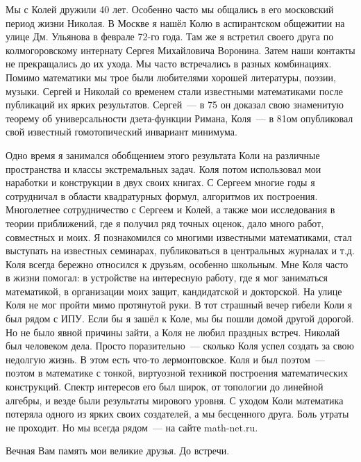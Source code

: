 
\vzmscaption

Мы с Колей дружили 40 лет. Особенно часто мы общались в его московский период жизни Николая.
В Москве я нашёл Колю в аспирантском общежитии на улице Дм. Ульянова в феврале 72-го  года.
Там же   я встретил   своего друга по колмогоровскому интернату Сергея  Михайловича Воронина.
Затем наши контакты не прекращались до их ухода. Мы часто встречались в разных комбинациях.
Помимо математики мы трое были любителями хорошей литературы, поэзии, музыки.
Сергей и Николай со временем стали  известными математиками после публикаций их ярких результатов.
Сергей~--- в 75 он  доказал свою знаменитую теорему об универсальности дзета-функции Римана,
Коля~--- в  81ом опубликовал свой известный гомотопический инвариант минимума.

Одно время я занимался обобщением этого результата Коли на различные   пространства  и классы экстремальных задач.
Коля потом использовал мои наработки и конструкции в двух своих книгах.
С Сергеем многие годы я сотрудничал в области квадратурных формул, алгоритмов их построения.
Многолетнее сотрудничество с Сергеем и Колей, а также мои исследования в теории приближений, где я получил ряд точных оценок,
дало много работ, совместных и моих.
Я познакомился со многими известными математиками, стал выступать на известных семинарах,
публиковаться в центральных журналах и т.д.
Коля всегда бережно относился к друзьям, особенно школьным.
Мне Коля часто в жизни помогал: в  устройстве на интересную работу, где я мог заниматься математикой,
в организации  моих защит, кандидатской и докторской. На улице Коля не мог пройти мимо протянутой руки.
В тот страшный вечер гибели  Коли я был рядом с ИПУ.  Если бы я зашёл к Коле, мы бы пошли домой другой дорогой.
Но не было явной причины зайти, а Коля не любил праздных встреч. Николай был человеком дела.
Просто поразительно~--- сколько Коля успел создать за свою недолгую жизнь. В  этом есть что-то лермонтовское.
Коля и был поэтом~--- поэтом в математике с  тонкой, виртуозной техникой построения математических конструкций.
Спектр интересов его был широк, от топологии до линейной алгебры, и везде были результаты  мирового уровня.
С уходом Коли математика потеряла одного из ярких своих создателей, а мы бесценного друга.
Боль утраты не проходит. Но мы  всегда рядом~--- на сайте  math-net.ru.

Вечная Вам память мои великие друзья.   До встречи.


